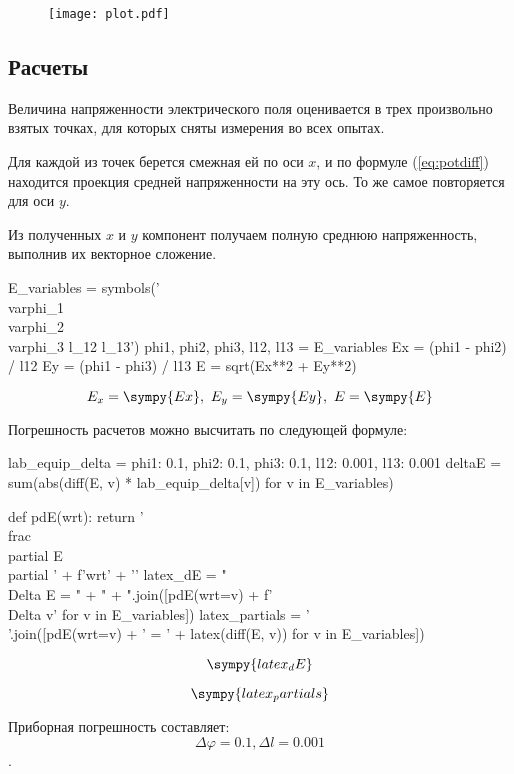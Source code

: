 \documentclass[12pt, a4paper]{article}
\begin{document}
\begin{figure}[H]
\texttt{[image: plot.pdf]}
\end{figure}

\subsection*{Расчеты}

Величина напряженности электрического поля оценивается в трех произвольно
взятых точках, для которых сняты измерения во всех опытах.

Для каждой из точек берется смежная ей по оси $x$, и по формуле (\ref{eq:potdiff})
находится проекция средней напряженности на эту ось. То же самое повторяется
для оси $y$.

Из полученных $x$ и $y$ компонент получаем полную среднюю напряженность,
выполнив их векторное сложение.

\begin{sympycode}
E_variables = symbols('\\varphi_1 \\varphi_2 \\varphi_3 l_{12} l_{13}')
phi1, phi2, phi3, l12, l13 = E_variables
Ex = (phi1 - phi2) / l12
Ey = (phi1 - phi3) / l13
E = sqrt(Ex**2 + Ey**2)
\end{sympycode}

$$E_x=\sympy{Ex},\ E_y=\sympy{Ey},\ E=\sympy{E}$$

Погрешность расчетов можно высчитать по следующей формуле:

\begin{sympycode}
lab_equip_delta = { phi1: 0.1, phi2: 0.1, phi3: 0.1, l12: 0.001, l13: 0.001 }
deltaE = sum(abs(diff(E, v) * lab_equip_delta[v]) for v in E_variables)

def pdE(wrt): return '\\frac{\\partial E}{\\partial ' + f'{wrt}' + '}'
latex_dE = "\\Delta E = " + " + ".join([pdE(wrt=v) + f'\\Delta {v}' for v in E_variables])
latex_partials = '$$$$'.join([pdE(wrt=v) + ' = ' + latex(diff(E, v)) for v in E_variables])
\end{sympycode}

$$\sympy{latex_dE}$$

$$\sympy{latex_partials}$$

Приборная погрешность составляет:
$$\Delta\varphi = 0.1, \Delta l = 0.001$$.
\end{document}
